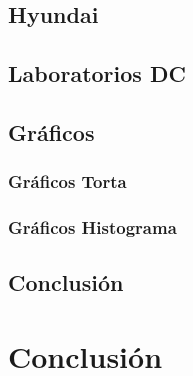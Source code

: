 \documentclass[final,narroweqnarray,inline]{ieee}
\begin{document}
  \subsection{Hyundai}

  \subsection{Laboratorios DC}

  \subsection{Gráficos}
  \subsubsection*{Gráficos Torta}
  \subsubsection*{Gráficos Histograma}

  \subsection{Conclusión}

\newpage
\section{Conclusión}






\end{document}
